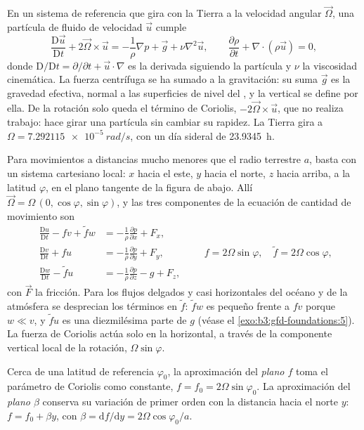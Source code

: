 En un sistema de referencia que gira con la Tierra a la velocidad angular
$\vec\Omega$, una partícula de fluido de velocidad $\vec u$ cumple
\[
\frac{\mathrm D\vec u}{\mathrm Dt} + 2\vec\Omega\times\vec u =
-\frac{1}{\rho}\nabla p + \vec g + \nu\nabla^2\vec u ,
\qquad
\frac{\partial\rho}{\partial t} + \nabla\cdot(\rho\vec u) = 0 ,
\]
donde $\mathrm D/\mathrm Dt = \partial/\partial t + \vec u\cdot\nabla$ es
la derivada siguiendo la partícula y $\nu$ la viscosidad cinemática. La
fuerza centrífuga se ha sumado a la gravitación: su suma $\vec g$ es la
gravedad efectiva, normal a las superficies de nivel del , y la
vertical se define por ella. De la rotación solo queda el término de Coriolis, $-2\vec\Omega\times
\vec u$, que no realiza trabajo: hace girar una partícula
sin cambiar su rapidez. La Tierra gira a $\Omega =
\qty{7.292115e-5}{rad/s}$, con un día sideral de \qty{23.9345}{h}.

Para movimientos a distancias mucho menores que el radio terrestre $a$, basta
con un sistema cartesiano local: $x$ hacia el este, $y$ hacia el norte, $z$
hacia arriba, a la latitud $\varphi$, en el plano tangente de la figura de abajo. Allí
$\vec\Omega = \Omega\,(0, \cos\varphi, \sin\varphi)$, y las tres
componentes de la ecuación de cantidad de movimiento son
\[
\begin{aligned}
\frac{\mathrm Du}{\mathrm Dt} - f v + \tilde f w &= -\frac{1}{\rho}\frac{\partial p}{\partial x} + F_x ,\\
\frac{\mathrm Dv}{\mathrm Dt} + f u &= -\frac{1}{\rho}\frac{\partial p}{\partial y} + F_y ,\\
\frac{\mathrm Dw}{\mathrm Dt} - \tilde f u &= -\frac{1}{\rho}\frac{\partial p}{\partial z} - g + F_z ,
\end{aligned}
\qquad f = 2\Omega\sin\varphi,\quad \tilde f = 2\Omega\cos\varphi ,
\]
con $\vec F$ la fricción. Para los flujos delgados y casi horizontales del
océano y de la atmósfera se desprecian los términos en $\tilde f$: $\tilde f w$
es pequeño frente a $fv$ porque $w \ll v$, y $\tilde f u$ es una diezmilésima
parte de $g$ (véase el \cref{exo:b3:gfd-foundations:5}). La fuerza de Coriolis actúa solo
en la horizontal, a través de la componente vertical local de
la rotación, $\Omega\sin\varphi$.

\begin{definition}\label{def:b3:gfd-foundations:planes}
Cerca de una latitud de referencia $\varphi_0$, la aproximación del \emph{plano $f$}
toma el parámetro de Coriolis como constante, $f = f_0 =
2\Omega\sin\varphi_0$. La aproximación del \emph{plano $\beta$}
conserva su variación de primer orden con la distancia hacia el norte $y$:
$f = f_0 + \beta y$, con $\beta = \mathrm df/\mathrm dy = 2\Omega
\cos\varphi_0/a$.
\end{definition}

